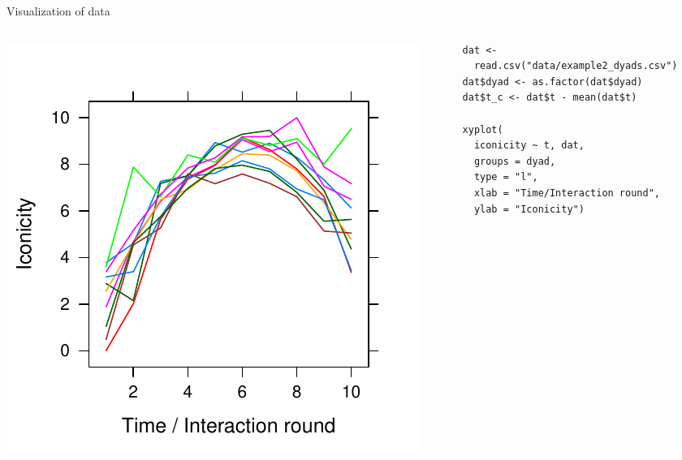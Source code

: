 \documentclass[aspectratio=169]{beamer}
\begin{document}
\begin{frame}[fragile]{Visualization of data}
  \begin{columns}
    \begin{column}{.5\textwidth}
      \includegraphics[scale=.8]{../figures/icon}
    \end{column}
    \begin{column}{.5\textwidth}
      \begin{lstlisting}
dat <- 
  read.csv("data/example2_dyads.csv")
dat$dyad <- as.factor(dat$dyad)
dat$t_c <- dat$t - mean(dat$t)

xyplot(
  iconicity ~ t, dat,
  groups = dyad,
  type = "l",
  xlab = "Time/Interaction round",
  ylab = "Iconicity")
      \end{lstlisting}
    \end{column}
  \end{columns}
\end{frame}
\end{document}
